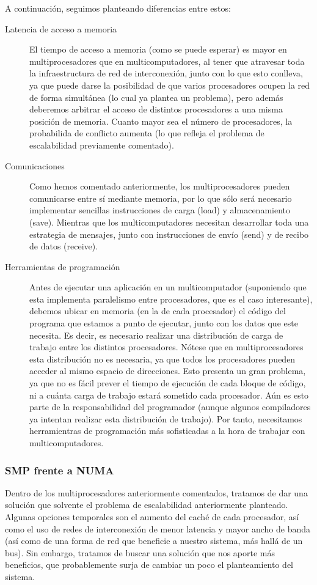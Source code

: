 A continuación, seguimos planteando diferencias entre estos:
\begin{description}
    \item [Latencia de acceso a memoria]
        El tiempo de acceso a memoria (como se puede esperar) es mayor en multiprocesadores que en multicomputadores, al tener que atravesar toda la infraestructura de red de interconexión, junto con lo que esto conlleva, ya que puede darse la posibilidad de que varios procesadores ocupen la red de forma simultánea (lo cual ya plantea un problema), pero además deberemos arbitrar el acceso de distintos procesadores a una misma posición de memoria. Cuanto mayor sea el número de procesadores, la probabilida de conflicto aumenta (lo que refleja el problema de escalabilidad previamente comentado). 
    \item [Comunicaciones]
        Como hemos comentado anteriormente, los multiprocesadores pueden comunicarse entre sí mediante memoria, por lo que sólo será necesario implementar sencillas instrucciones de carga (load) y almacenamiento (save). Mientras que los multicomputadores necesitan desarrollar toda una estrategia de mensajes, junto con instrucciones de envío (send) y de recibo de datos (receive). 
    \item [Herramientas de programación]
        Antes de ejecutar una aplicación en un multicomputador (suponiendo que esta implementa paralelismo entre procesadores, que es el caso interesante), debemos ubicar en memoria (en la de cada procesador) el código del programa que estamos a punto de ejecutar, junto con los datos que este necesita. Es decir, es necesario realizar una distribución de carga de trabajo entre los distintos procesadores. Nótese que en multiprocesadores esta distribución no es necesaria, ya que todos los procesadores pueden acceder al mismo espacio de direcciones. Esto presenta un gran problema, ya que no es fácil prever el tiempo de ejecución de cada bloque de código, ni a cuánta carga de trabajo estará sometido cada procesador. Aún es esto parte de la responsabilidad del programador (aunque algunos compiladores ya intentan realizar esta distribución de trabajo). Por tanto, necesitamos herramientras de programación más sofisticadas a la hora de trabajar con multicomputadores.
\end{description}

\subsubsection{SMP frente a NUMA}
Dentro de los multiprocesadores anteriormente comentados, tratamos de dar una solución que solvente el problema de escalabilidad anteriormente planteado. Algunas opciones temporales son el aumento del caché de cada procesador, así como el uso de redes de interconexión de menor latencia y mayor ancho de banda (así como de una forma de red que beneficie a nuestro sistema, más hallá de un bus). Sin embargo, tratamos de buscar una solución que nos aporte más beneficios, que probablemente surja de cambiar un poco el planteamiento del sistema.

